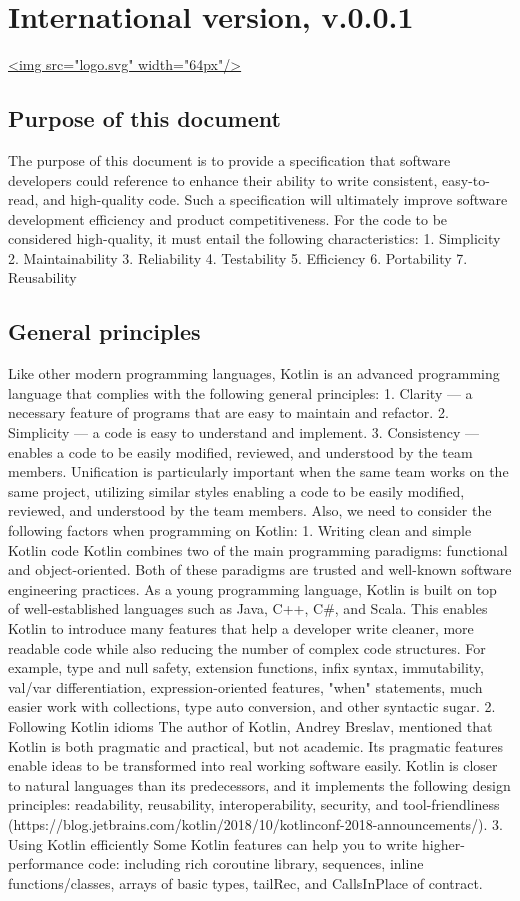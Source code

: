 \section*{International version, v.0.0.1}
\hspace{0.0cm}\hyperref[sec:]{<img src="logo.svg" width="64px"/>}
\subsection*{\textbf{Purpose of this document}}
\label{sec:}
The purpose of this document is to provide a specification that software developers could reference to enhance their ability to write consistent, easy-to-read, and high-quality code.
Such a specification will ultimately improve software development efficiency and product competitiveness.
For the code to be considered high-quality, it must entail the following characteristics:
1.	Simplicity
2.	Maintainability
3.	Reliability
4.	Testability
5.	Efficiency
6.	Portability
7.	Reusability
\subsection*{\textbf{General principles}}
Like other modern programming languages, Kotlin is an advanced programming language that complies with the following general principles:
1.	Clarity — a necessary feature of programs that are easy to maintain and refactor.
2.	Simplicity — a code is easy to understand and implement.
3.	Consistency — enables a code to be easily modified, reviewed, and understood by the team members. Unification is particularly important when the same team works on the same project, utilizing similar styles enabling a code to be easily modified, reviewed, and understood by the team members.
Also, we need to consider the following factors when programming on Kotlin:
1. Writing clean and simple Kotlin code
    Kotlin combines two of the main programming paradigms: functional and object-oriented.
    Both of these paradigms are trusted and well-known software engineering practices.
    As a young programming language, Kotlin is built on top of well-established languages such as Java, C++, C\#, and Scala.
    This enables Kotlin to introduce many features that help a developer write cleaner, more readable code while also reducing the number of complex code structures. For example, type and null safety, extension functions, infix syntax, immutability, val/var differentiation, expression-oriented features, "when" statements, much easier work with collections, type auto conversion, and other syntactic sugar.
2. Following Kotlin idioms
    The author of Kotlin, Andrey Breslav, mentioned that Kotlin is both pragmatic and practical, but not academic. 
    Its pragmatic features enable ideas to be transformed into real working software easily. Kotlin is closer to natural languages than its predecessors, and it implements the following design principles: readability, reusability, interoperability, security, and tool-friendliness (https://blog.jetbrains.com/kotlin/2018/10/kotlinconf-2018-announcements/).
3. Using Kotlin efficiently
    Some Kotlin features can help you to write higher-performance code: including rich coroutine library, sequences, inline functions/classes, arrays of basic types, tailRec, and CallsInPlace of contract.
